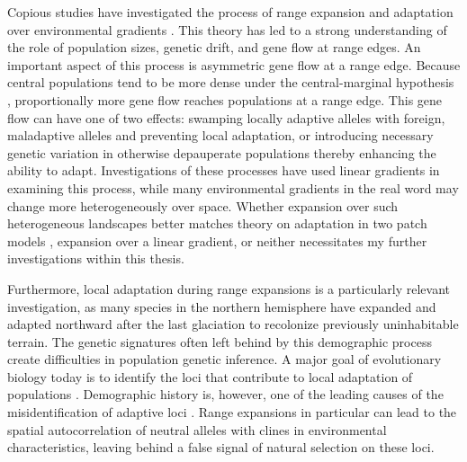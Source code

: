 Copious studies have investigated the process of range expansion and adaptation over environmental gradients \citep{Kirkpatrick:1997, Barton:2001, Bridle:2010, Polechova:2015, GarciaRamos:1997}. This theory has led to a strong understanding of the role of population sizes, genetic drift, and gene flow at range edges. An important aspect of this process is asymmetric gene flow at a range edge. Because central populations tend to be more dense under the central-marginal hypothesis \citep{Brown:1984, Eckert:2008}, proportionally more gene flow reaches populations at a range edge. This gene flow can have one of two effects: swamping locally adaptive alleles with foreign, maladaptive alleles and preventing local adaptation, or introducing necessary genetic variation in otherwise depauperate populations thereby enhancing the ability to adapt. Investigations of these processes have used linear gradients in examining this process, while many environmental gradients in the real word may change more heterogeneously over space. Whether expansion over such heterogeneous landscapes better matches theory on adaptation in two patch models \citep{Gomulkiewicz:1995, Ronce:2001, Holt:1997, Gomulkiewicz:1999}, expansion over a linear gradient, or neither necessitates my further investigations within this thesis.

Furthermore, local adaptation during range expansions is a particularly relevant investigation, as many species in the northern hemisphere have expanded and adapted northward after the last glaciation to recolonize previously uninhabitable terrain. The genetic signatures often left behind by this demographic process create difficulties in population genetic inference. A major goal of evolutionary biology today is to identify the loci that contribute to local adaptation of populations \citep{Savolainen:2013, Whitlock:2015, LeCorre:2012, Coop:2010}. Demographic history is, however, one of the leading causes of the misidentification of adaptive loci \citep{Whitlock:2015}. Range expansions in particular can lead to the spatial autocorrelation of neutral alleles with clines in environmental characteristics, leaving behind a false signal of natural selection on these loci.

